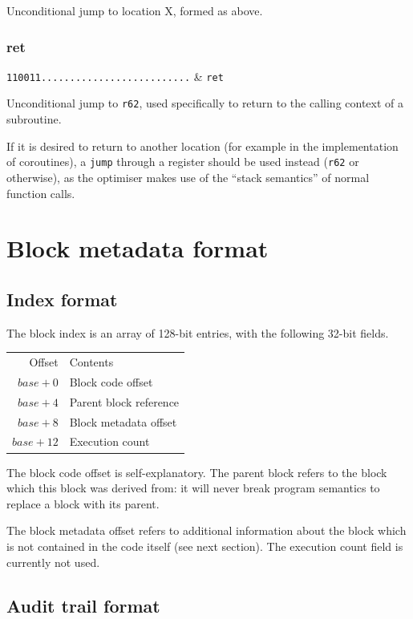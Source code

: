 Unconditional jump to location X, formed as above.

\subsubsection{ret}

\decfmt
\texttt{110011..........................} & \texttt{ret}
\finfmt

Unconditional jump to \texttt{r62}, used specifically to return to the calling context of a subroutine.

If it is desired to return to another location (for example in the implementation of coroutines), a \texttt{jump} through a register should be used instead (\texttt{r62} or otherwise), as the optimiser makes use of the ``stack semantics'' of normal function calls.

\section{Block metadata format}

\subsection{Index format}

The block index is an array of 128-bit entries, with the following 32-bit fields.

\begin{tabular}[t]{rl}
Offset & Contents \\[0.5ex]
$base+0$ & Block code offset \\
$base+4$ & Parent block reference \\
$base+8$ & Block metadata offset \\
$base+12$ & Execution count
\end{tabular}

The block code offset is self-explanatory. The parent block refers to the block which this block was derived from: it will never break program semantics to replace a block with its parent.

The block metadata offset refers to additional information about the block which is not contained in the code itself (see next section). The execution count field is currently not used.

\subsection{Audit trail format}

